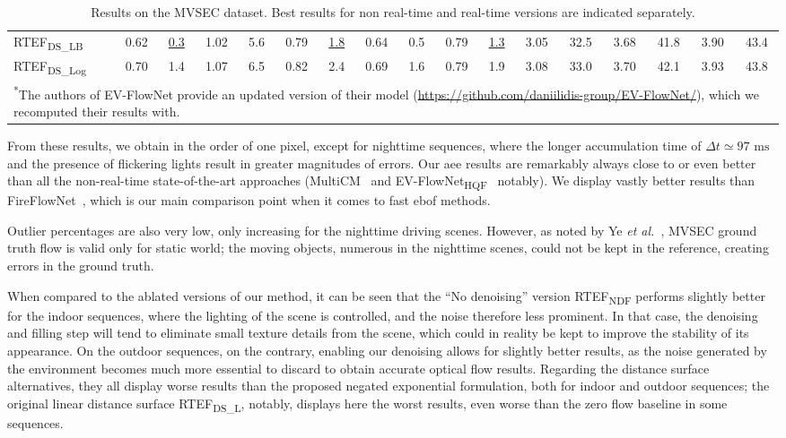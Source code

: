\begin{table}[ht]
{\begin{tabular}{@{}l cc cc cc cc cc cc cc cc@{}}
      RTEF\textsubscript{DS\_LB} & 0.62 & \underline{0.3} & 1.02 & 5.6 & 0.79 & \underline{1.8} & 0.64 & 0.5 & 0.79 & \underline{1.3} & 3.05 & 32.5 & 3.68 & 41.8 & 3.90 & 43.4 \\
      RTEF\textsubscript{DS\_Log} & 0.70 & 1.4 & 1.07 & 6.5 & 0.82 & 2.4 & 0.69 & 1.6 & 0.79 & 1.9 & 3.08 & 33.0 & 3.70 & 42.1 & 3.93 & 43.8 \\
      \bottomrule
      \multicolumn{17}{l}{\textsuperscript{*}The authors of EV-FlowNet provide an updated version of their model (\url{https://github.com/daniilidis-group/EV-FlowNet/}), which we recomputed their results with.}
    \end{tabular}
  }
  \caption{Results on the MVSEC dataset. Best results for non real-time and real-time versions are indicated separately.}\label{tab:ebof:mvsec_results}
\end{table}

From these results, we obtain  in the order of one pixel, except for nighttime sequences, where the longer accumulation time of \(\Delta t \simeq 97\text{ ms}\) and the presence of flickering lights result in greater magnitudes of errors. Our \acrshort{aee} results are remarkably always close to or even better than all the non-real-time state-of-the-art approaches (MultiCM~\cite{Shiba2022SecretsOE} and EV-FlowNet\textsubscript{HQF}~\cite{Stoffregen2020ReducingTS} notably). We display vastly better results than FireFlowNet~\cite{ParedesValls2021BackTE}, which is our main comparison point when it comes to fast \acrshort{ebof} methods.

Outlier percentages are also very low, only increasing for the nighttime driving scenes. However, as noted by Ye \textit{et al.}~\cite{Ye2020UnsupervisedLO}, MVSEC ground truth flow is valid only for static world; the moving objects, numerous in the nighttime scenes, could not be kept in the reference, creating errors in the ground truth.

When compared to the ablated versions of our method, it can be seen that the ``No denoising'' version RTEF\textsubscript{NDF} performs slightly better for the indoor sequences, where the lighting of the scene is controlled, and the noise therefore less prominent. In that case, the denoising and filling step will tend to eliminate small texture details from the scene, which could in reality be kept to improve the stability of its appearance. On the outdoor sequences, on the contrary, enabling our denoising allows for slightly better results, as the noise generated by the environment becomes much more essential to discard to obtain accurate optical flow results. Regarding the distance surface alternatives, they all display worse results than the proposed negated exponential formulation, both for indoor and outdoor sequences; the original linear distance surface RTEF\textsubscript{DS\_L}, notably, displays here the worst results, even worse than the zero flow baseline in some sequences.

